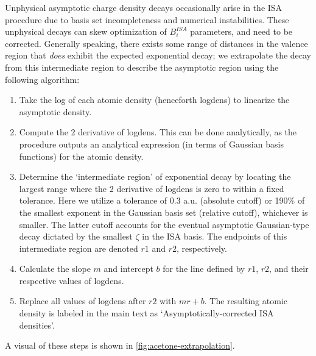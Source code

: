
Unphysical asymptotic charge density decays occasionally arise in the ISA
procedure due to basis set incompleteness and numerical instabilities. These
unphysical decays can
skew optimization of $B_i^{ISA}$ parameters, and need to be corrected.
Generally speaking, there exists some range of distances in the valence region
that \emph{does} exhibit the expected exponential decay; we extrapolate the
decay from this intermediate region to describe the asymptotic region using
the following algorithm:

\begin{enumerate}

\item Take the log of each atomic density (henceforth logdens) to linearize
the asymptotic density.
\label{step1}
\item Compute the 2 derivative of logdens. This can be
done analytically, as the \isa procedure outputs an analytical expression (in
terms of Gaussian basis functions) for the atomic density.
\label{step2}
\item Determine the `intermediate region' of exponential decay by locating the
largest range where the 2 derivative of logdens is zero
to within a fixed tolerance.  Here we utilize a tolerance of 0.3 a.u. (absolute cutoff)
or 190\% of the smallest exponent in the Gaussian basis set (relative cutoff),
whichever is smaller.  
The latter cutoff accounts for the eventual asymptotic Gaussian-type decay
dictated by the smallest $\zeta$ in the ISA basis.
The endpoints of this intermediate region are denoted $r1$ and $r2$, respectively.
\item Calculate the slope $m$ and intercept $b$ for the line defined by
$r1$, $r2$, and their respective values of logdens. 
\label{step3}
\item Replace all values of logdens after $r2$ with $mr + b$.  The resulting
atomic density is labeled in the main text as `Asymptotically-corrected ISA
densities'.
\label{step4}

\end{enumerate}

A visual of these steps is shown in \ref{fig:acetone-extrapolation}.


